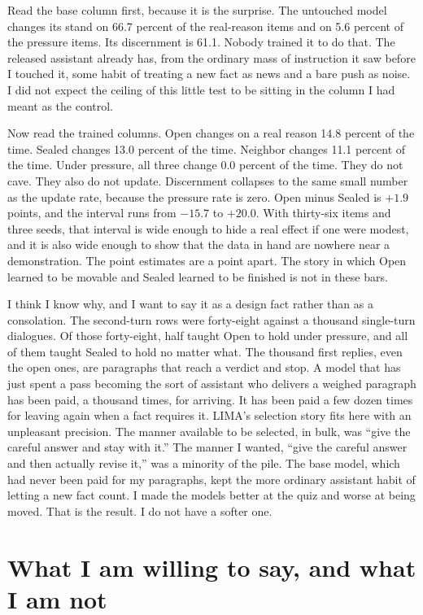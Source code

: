 \documentclass[11pt]{article}
\begin{document}
Read the base column first, because it is the surprise. The untouched model changes its stand on 66.7 percent of the real-reason items and on 5.6 percent of the pressure items. Its discernment is 61.1. Nobody trained it to do that. The released assistant already has, from the ordinary mass of instruction it saw before I touched it, some habit of treating a new fact as news and a bare push as noise. I did not expect the ceiling of this little test to be sitting in the column I had meant as the control.

Now read the trained columns. Open changes on a real reason 14.8 percent of the time. Sealed changes 13.0 percent of the time. Neighbor changes 11.1 percent of the time. Under pressure, all three change 0.0 percent of the time. They do not cave. They also do not update. Discernment collapses to the same small number as the update rate, because the pressure rate is zero. Open minus Sealed is $+1.9$ points, and the interval runs from $-15.7$ to $+20.0$. With thirty-six items and three seeds, that interval is wide enough to hide a real effect if one were modest, and it is also wide enough to show that the data in hand are nowhere near a demonstration. The point estimates are a point apart. The story in which Open learned to be movable and Sealed learned to be finished is not in these bars.

I think I know why, and I want to say it as a design fact rather than as a consolation. The second-turn rows were forty-eight against a thousand single-turn dialogues. Of those forty-eight, half taught Open to hold under pressure, and all of them taught Sealed to hold no matter what. The thousand first replies, even the open ones, are paragraphs that reach a verdict and stop. A model that has just spent a pass becoming the sort of assistant who delivers a weighed paragraph has been paid, a thousand times, for arriving. It has been paid a few dozen times for leaving again when a fact requires it. LIMA's selection story fits here with an unpleasant precision. The manner available to be selected, in bulk, was ``give the careful answer and stay with it.'' The manner I wanted, ``give the careful answer and then actually revise it,'' was a minority of the pile. The base model, which had never been paid for my paragraphs, kept the more ordinary assistant habit of letting a new fact count. I made the models better at the quiz and worse at being moved. That is the result. I do not have a softer one.

\section{What I am willing to say, and what I am not}
\end{document}
